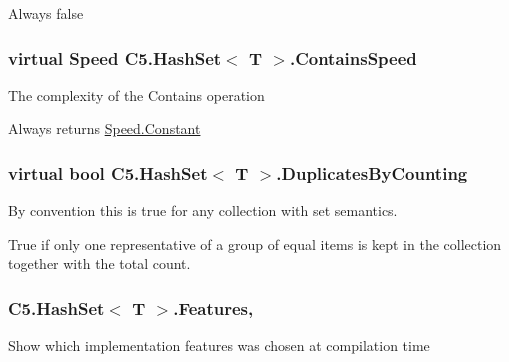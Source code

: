 Always false\hypertarget{class_c5_1_1_hash_set_a206298276b5ddfbb9a528df96a5620ae}{}
\subsubsection[{Contains\+Speed}]{\setlength{\rightskip}{0pt plus 5cm}virtual {\bf Speed} {\bf C5.\+Hash\+Set}$<$ T $>$.Contains\+Speed\hspace{0.3cm}{\ttfamily [get]}}\label{class_c5_1_1_hash_set_a206298276b5ddfbb9a528df96a5620ae}


The complexity of the Contains operation 

Always returns \hyperlink{namespace_c5_a615ba88dcdaa8d5a3c5f833a73d7fad6acb17869fe51048b5a5c4c6106551a255}{Speed.\+Constant}\hypertarget{class_c5_1_1_hash_set_ae9ad56098db41bbbd2a0baabef06bc14}{}
\subsubsection[{Duplicates\+By\+Counting}]{\setlength{\rightskip}{0pt plus 5cm}virtual bool {\bf C5.\+Hash\+Set}$<$ T $>$.Duplicates\+By\+Counting\hspace{0.3cm}{\ttfamily [get]}}\label{class_c5_1_1_hash_set_ae9ad56098db41bbbd2a0baabef06bc14}


By convention this is true for any collection with set semantics. 

True if only one representative of a group of equal items is kept in the collection together with the total count.\hypertarget{class_c5_1_1_hash_set_af105c294816c484c8e48544daa7c0b32}{}
\subsubsection[{Features}]{ {\bf C5.\+Hash\+Set}$<$ T $>$.Features\hspace{0.3cm}{\ttfamily [static]}, {\ttfamily [get]}}\label{class_c5_1_1_hash_set_af105c294816c484c8e48544daa7c0b32}


Show which implementation features was chosen at compilation time 

